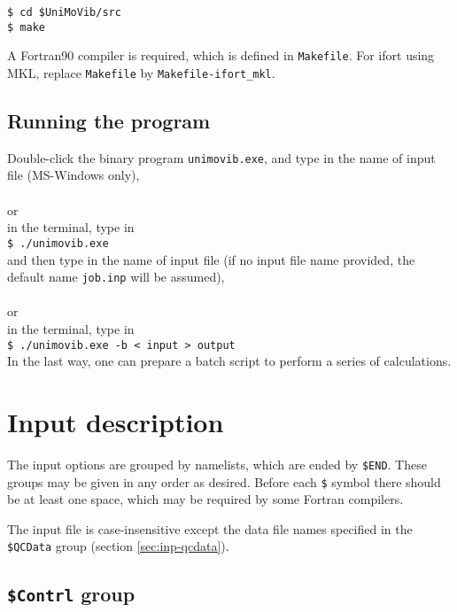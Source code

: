 \documentclass[12pt,english]{extarticle}
\begin{document}
\verb|$ cd $UniMoVib/src| \\
\verb|$ make |

A Fortran90 compiler is required, which is defined in \verb|Makefile|.
For ifort using MKL, replace \verb|Makefile| by \verb|Makefile-ifort_mkl|.

\subsection{Running the program} \label{sec:run}

Double-click the binary program \verb|unimovib.exe|, and type in the name of input file (MS-Windows only), \\ \\
or \\
in the terminal, type in \\
\verb|$ ./unimovib.exe | \\
and then type in the name of input file (if no input file name provided, the default name \verb|job.inp| will be assumed), \\ \\
or \\
in the terminal, type in \\
\verb|$ ./unimovib.exe -b < input > output | \\

In the last way, one can prepare a batch script to perform a series of calculations.

\pagebreak{}


\section{Input description} \label{part:input}

The input options are grouped by namelists, which are ended by \verb|$END|.
These groups may be given in any order as desired. Before each \verb|$| symbol
there should be at least one space, which may be required by some Fortran compilers.

The input file is case-insensitive except the data file names specified in the \verb|$QCData|
group (section \ref{sec:inp-qcdata}).

\subsection{\texttt{\$Contrl} group} \label{sec:inp-contrl}
\end{document}
